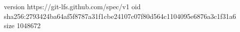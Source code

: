 version https://git-lfs.github.com/spec/v1
oid sha256:2793424ba64af5f8787a31f1cbe24107c07f80d564c1104095e6876a3c1f31a6
size 1048672
